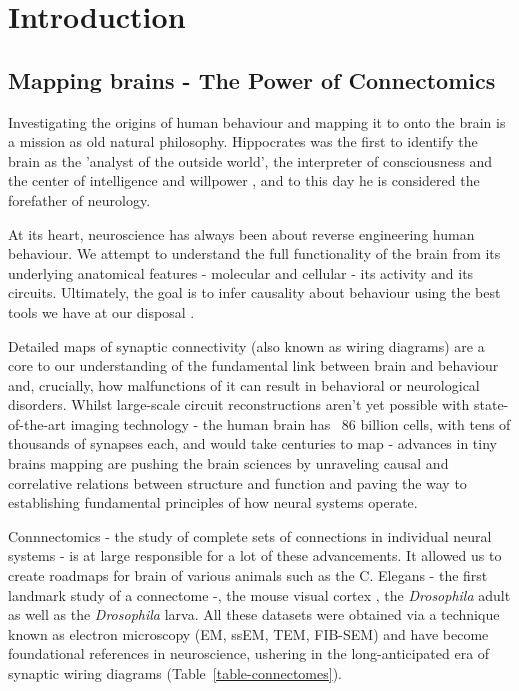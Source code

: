 
\chapter{Introduction}  

\section{Mapping brains - The Power of Connectomics} 

\label{Mapping Brains}
Investigating the origins of human behaviour and mapping it to onto the brain is a mission as old natural philosophy. Hippocrates was the first to identify the brain as the 'analyst of the outside world', the interpreter of consciousness and the center of intelligence and willpower \citep{breitenfeld2014hippocrates}, and to this day he is considered the forefather of neurology.

At its heart, neuroscience has always been about reverse engineering human behaviour. 
We attempt to understand the full functionality of the brain from its underlying anatomical features - molecular and cellular -  its activity and its circuits. Ultimately, the goal is to infer causality about behaviour using the best tools we have at our disposal \citep{mckinstry2013connectome}.

Detailed maps of synaptic connectivity (also known as wiring diagrams) are a core to our understanding of the fundamental link between brain and behaviour and, crucially, how malfunctions of it can result in behavioral or neurological disorders. Whilst large-scale circuit reconstructions aren't yet possible with state-of-the-art imaging technology - the human brain has ~86 billion cells\cite{herculano2009human}, with tens of thousands of synapses each, and would take centuries to map -  advances in tiny brains mapping are pushing the brain sciences by unraveling causal and correlative relations between structure and function and paving the way to establishing fundamental principles of how neural systems operate. 

Connnectomics - the study of complete sets of connections in individual neural systems - is at large responsible for a lot of these advancements. It allowed us to create roadmaps for brain of various animals such as the C. Elegans - the first landmark study of a connectome \citep{brenner1974genetics} -, the mouse visual cortex \citep{microns2025functional}, the \textit{Drosophila} adult \citep{scheffer2020connectome} as well as the \textit{Drosophila} larva\citep{ohyama2015multilevel, berck2016wiring,larderet2017opticlobe,eichler2017complete, eschbach2021circuits, eschbach2020recurrent}. All these datasets were obtained via a technique known as electron microscopy (EM, ssEM, TEM, FIB-SEM) and have become foundational references in neuroscience, ushering in the long-anticipated era of synaptic wiring diagrams (Table~\ref{table-connectomes}).

